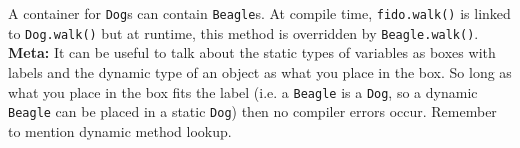 \begin{blocksection}
\begin{parts}
\begin{solution}[0.7in]
A container for \lstinline$Dog$s can contain \lstinline$Beagle$s. At compile
time, \lstinline$fido.walk()$ is linked to \lstinline$Dog.walk()$ but at
runtime, this method is overridden by \lstinline$Beagle.walk()$.
\textbf{Meta:} It can be useful to talk about the static types of variables as boxes with labels and the dynamic type 
of an object as what you place in the box. So long as what you place in the box fits the label (i.e. a \lstinline$Beagle$ 
is a \lstinline$Dog$, so a dynamic \lstinline$Beagle$ can be placed in a static \lstinline$Dog$) then no compiler errors occur. Remember to mention dynamic method lookup.
\end{solution}
\end{parts}
\end{blocksection}

\begin{solution}

\end{solution}
